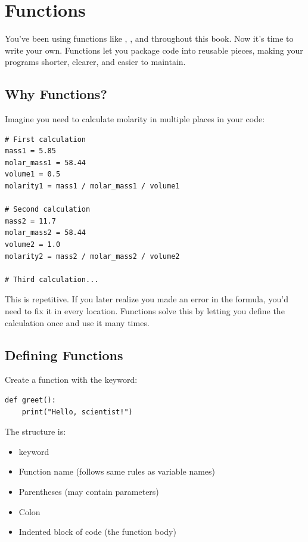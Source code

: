 
\chapter{Functions}
\label{chap:functions}

You've been using functions like , , and  throughout this book. Now it's time to write your own. Functions let you package code into reusable pieces, making your programs shorter, clearer, and easier to maintain.

\section{Why Functions?}
\label{sec:why-functions}

Imagine you need to calculate molarity in multiple places in your code:

\begin{lstlisting}
# First calculation
mass1 = 5.85
molar_mass1 = 58.44
volume1 = 0.5
molarity1 = mass1 / molar_mass1 / volume1

# Second calculation
mass2 = 11.7
molar_mass2 = 58.44
volume2 = 1.0
molarity2 = mass2 / molar_mass2 / volume2

# Third calculation...
\end{lstlisting}

This is repetitive. If you later realize you made an error in the formula, you'd need to fix it in every location. Functions solve this by letting you define the calculation once and use it many times.

\section{Defining Functions}
\label{sec:defining-functions}

Create a function with the  keyword:

\begin{lstlisting}
def greet():
    print("Hello, scientist!")
\end{lstlisting}

The structure is:
\begin{itemize}
    \item {} keyword
    \item Function name (follows same rules as variable names)
    \item Parentheses (may contain parameters)
    \item Colon
    \item Indented block of code (the function body)
\end{itemize}


